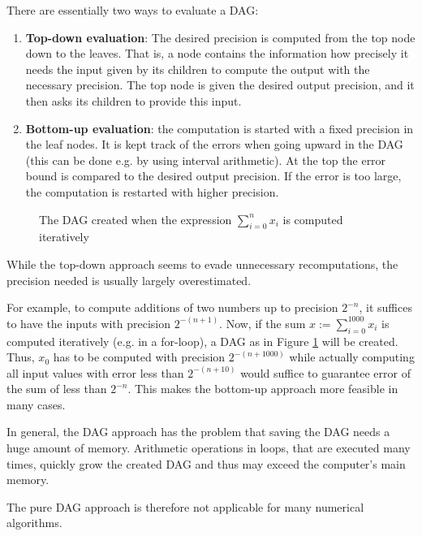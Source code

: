 		There are essentially two ways to evaluate a DAG:
		\begin{enumerate}
			\item \textbf{Top-down evaluation}: The desired precision is computed from the top node down to the leaves.
			That is, a node contains the information how precisely it needs the
      input given by its children to compute the output with the necessary precision.
      The top node is given the desired output precision, and it then asks its
      children to provide this input.
			\item \textbf{Bottom-up evaluation}:  the computation is started with a fixed precision in the leaf nodes. 
			It is kept track of the errors when going upward in the DAG (this can
      be done e.g. by using interval arithmetic). 
			At the top the error bound is compared to the desired output precision. 
      If the error is too large, the computation is restarted with higher
      precision.
		\end{enumerate}
    \begin{figure}[h]
      \centering
\caption{The DAG created when the expression $\sum_{i=0}^n x_i$ is computed
iteratively}\label{fig:sum dag}
\end{figure}
		While the top-down approach seems to evade unnecessary recomputations, the
    precision needed is usually largely overestimated.

    For example, to compute additions of two numbers up to precision $2^{-n}$,
    it suffices to have the inputs with precision $2^{-(n+1)}$.
    Now, if the sum $x := \sum_{i=0}^{1000} x_i$ is computed iteratively (e.g. in a
    for-loop), a DAG as in Figure \ref{fig:sum dag} will be created. 
    Thus, $x_0$ has to be computed with precision $2^{-(n+1000)}$ while actually
    computing all input values with error less than $2^{-(n+10)}$ would 
    suffice to guarantee error of the sum of less than $2^{-n}$.
    This makes the bottom-up approach more feasible in many cases.

    In general, the DAG approach has the problem that saving the DAG needs a
    huge amount of memory.
    Arithmetic operations in loops, that are executed many times, quickly grow
    the created DAG and thus may exceed the computer's main memory.

    The pure DAG approach is therefore not applicable for many 
    numerical algorithms.
